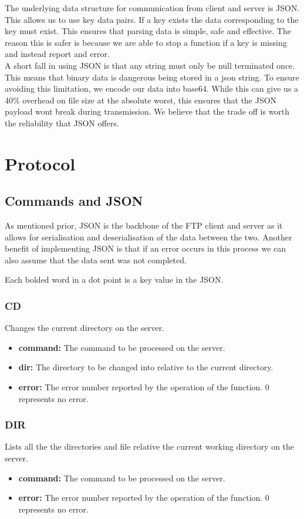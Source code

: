 \documentclass{article}
\begin{document}
The underlying data structure for communication from client and server is JSON. This allows us to use key data pairs. If a key exists the data corresponding to the key must exist. This ensures that parsing data is simple, safe and effective. The reason this is safer is because we are able to stop a function if a key is missing and instead report and error.\\

A short fall in using JSON is that any string must only be null terminated once. This means that binary data is dangerous being stored in a json string. To ensure avoiding this limitation, we encode our data into base64. While this can give us a 40\% overhead on file size at the absolute worst, this ensures that the JSON payload wont break during transmission. We believe that the trade off is worth the reliability that JSON offers.

\section{Protocol}
\subsection{Commands and JSON}
As mentioned prior, JSON is the backbone of the FTP client and server as it allows for serialisation and deserialisation of the data between the two. Another benefit of implementing JSON is that if an error occurs in this process we can also assume that the data sent was not completed.

Each bolded word in a dot point is a key value in the JSON.

\subsubsection{CD}
Changes the current directory on the server.
\begin{itemize}
\item \textbf{command:} The command to be processed on the server.
\item \textbf{dir:} The directory to be changed into relative to the current directory. 
\item \textbf{error:} The error number reported by the operation of the function. 0 represents no error.   
\end{itemize}
\subsubsection{DIR}
Lists all the the directories and file relative the current working directory on the server.
\begin{itemize}
\item \textbf{command:} The command to be processed on the server.
\item \textbf{error:} The error number reported by the operation of the function. 0 represents no error.
\end{itemize}
\end{document}

